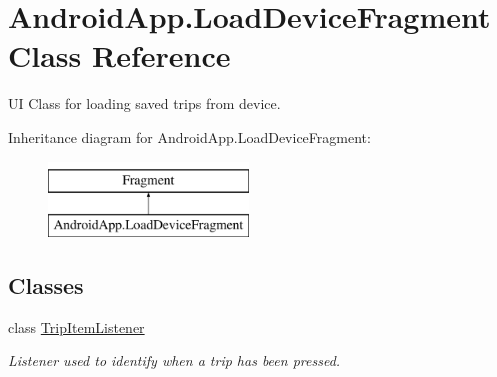 \hypertarget{class_android_app_1_1_load_device_fragment}{}\section{Android\+App.\+Load\+Device\+Fragment Class Reference}
\label{class_android_app_1_1_load_device_fragment}


UI Class for loading saved trips from device.  


Inheritance diagram for Android\+App.\+Load\+Device\+Fragment\+:\begin{figure}[H]
\begin{center}
\leavevmode
\includegraphics[height=2.000000cm]{class_android_app_1_1_load_device_fragment}
\end{center}
\end{figure}
\subsection*{Classes}
\begin{DoxyCompactItemize}
\item 
class \hyperlink{class_android_app_1_1_load_device_fragment_1_1_trip_item_listener}{Trip\+Item\+Listener}
\begin{DoxyCompactList}\small\item\em Listener used to identify when a trip has been pressed. \end{DoxyCompactList}\end{DoxyCompactItemize}
